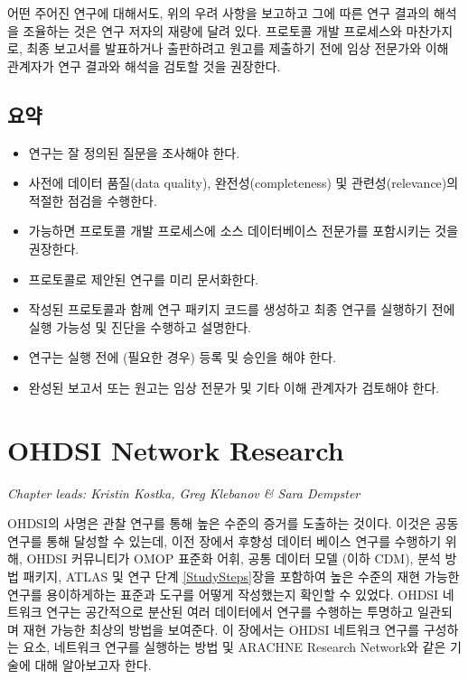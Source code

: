 \documentclass[11pt]{book}
\providecommand{\tightlist}{%
  \setlength{\itemsep}{0pt}\setlength{\parskip}{0pt}}
\theoremstyle{definition}
\theoremstyle{definition}
\theoremstyle{definition}
\theoremstyle{remark}
\let\BeginKnitrBlock\begin \let\EndKnitrBlock\end
\begin{document}
어떤 주어진 연구에 대해서도, 위의 우려 사항을 보고하고 그에 따른 연구
결과의 해석을 조율하는 것은 연구 저자의 재량에 달려 있다. 프로토콜 개발
프로세스와 마찬가지로, 최종 보고서를 발표하거나 출판하려고 원고를
제출하기 전에 임상 전문가와 이해 관계자가 연구 결과와 해석을 검토할 것을
권장한다.

\section{요약}\label{-16}

\BeginKnitrBlock{rmdsummary}
\begin{itemize}
\tightlist
\item
  연구는 잘 정의된 질문을 조사해야 한다.
\item
  사전에 데이터 품질(data quality), 완전성(completeness) 및
  관련성(relevance)의 적절한 점검을 수행한다.
\item
  가능하면 프로토콜 개발 프로세스에 소스 데이터베이스 전문가를
  포함시키는 것을 권장한다.
\item
  프로토콜로 제안된 연구를 미리 문서화한다.
\item
  작성된 프로토콜과 함께 연구 패키지 코드를 생성하고 최종 연구를
  실행하기 전에 실행 가능성 및 진단을 수행하고 설명한다.
\item
  연구는 실행 전에 (필요한 경우) 등록 및 승인을 해야 한다.
\item
  완성된 보고서 또는 원고는 임상 전문가 및 기타 이해 관계자가 검토해야
  한다.
\end{itemize}
\EndKnitrBlock{rmdsummary}

\chapter{OHDSI Network Research}\label{NetworkResearch}

\emph{Chapter leads: Kristin Kostka, Greg Klebanov \& Sara Dempster}

OHDSI의 사명은 관찰 연구를 통해 높은 수준의 증거를 도출하는 것이다.
이것은 공동 연구를 통해 달성할 수 있는데, 이전 장에서 후향성 데이터
베이스 연구를 수행하기 위해, OHDSI 커뮤니티가 OMOP 표준화 어휘, 공통
데이터 모델 (이하 CDM), 분석 방법 패키지, ATLAS 및 연구 단계
\ref{StudySteps}장을 포함하여 높은 수준의 재현 가능한 연구를
용이하게하는 표준과 도구를 어떻게 작성했는지 확인할 수 있었다. OHDSI
네트워크 연구는 공간적으로 분산된 여러 데이터에서 연구를 수행하는
투명하고 일관되며 재현 가능한 최상의 방법을 보여준다. 이 장에서는 OHDSI
네트워크 연구를 구성하는 요소, 네트워크 연구를 실행하는 방법 및 ARACHNE
Research Network와 같은 기술에 대해 알아보고자 한다.
\end{document}
